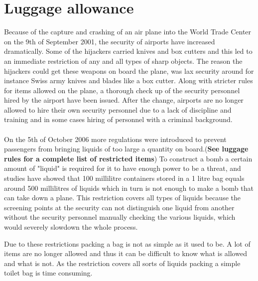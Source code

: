 \section{Luggage allowance}

Because of the capture and crashing of an air plane into the World Trade Center on the 9th of September 2001, the security of airports have increased dramatically. Some of the hijackers carried knives and box cutters and this led to an immediate restriction of any and all types of sharp objects. The reason the hijackers could get these weapons on board the plane, was lax security around for instance Swiss army knives and blades like a box cutter. Along with stricter rules for items allowed on the plane, a thorough check up of the security personnel hired by the airport have been issued. After the change, airports are no longer allowed to hire their own security personnel due to a lack of discipline and training and in some cases hiring of personnel with a criminal background.\citep{Stricter_rules}\\
\\
On the 5th of October 2006 more regulations were introduced to prevent passengers from bringing liquids of too large a quantity on board.(\textbf{See luggage rules for a complete list of restricted items}) To construct a bomb a certain amount of "liquid" is required for it to have enough power to be a threat, and studies have showed that 100 millilitre containers stored in a 1 litre bag equals around 500 millilitres of liquids which in turn is not enough to make a bomb that can take down a plane. This restriction covers all types of liquids because the screening points at the security can not distinguish one liquid from another without the security personnel manually checking the various liquids, which would severely slowdown the whole process.\citep{Why_rules}\newline

Due to these restrictions packing a bag is not as simple as it used to be. A lot of items are no longer allowed and thus it can be difficult to know what is allowed and what is not. As the restriction covers all sorts of liquids packing a simple toilet bag is time consuming.
